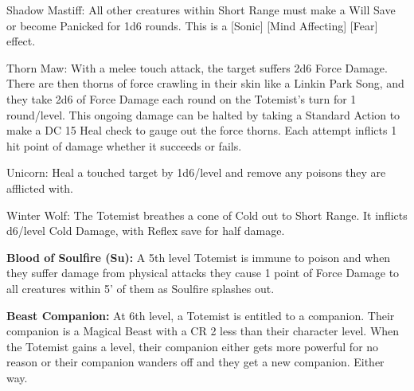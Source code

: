 \begin{itemize*}
\item Shadow Mastiff: All other creatures within Short Range must make a Will Save or become Panicked for 1d6 rounds. This is a [Sonic] [Mind Affecting] [Fear] effect. 
\item Thorn Maw: With a melee touch attack, the target suffers 2d6 Force Damage. There are then thorns of force crawling in their skin like a Linkin Park Song, and they take 2d6 of Force Damage each round on the Totemist's turn for 1 round/level. This ongoing damage can be halted by taking a Standard Action to make a DC 15 Heal check to gauge out the force thorns. Each attempt inflicts 1 hit point of damage whether it succeeds or fails. 
\item Unicorn: Heal a touched target by 1d6/level and remove any poisons they are afflicted with. 
\item Winter Wolf: The Totemist breathes a cone of Cold out to Short Range. It inflicts d6/level Cold Damage, with Reflex save for half damage.
\end{itemize*}

\textbf{Blood of Soulfire (Su):} A 5th level Totemist is immune to poison and when they suffer damage from physical attacks they cause 1 point of Force Damage to all creatures within 5' of them as Soulfire splashes out. 

\textbf{Beast Companion:} At 6th level, a Totemist is entitled to a companion. Their companion is a Magical Beast with a CR 2 less than their character level. When the Totemist gains a level, their companion either gets more powerful for no reason or their companion wanders off and they get a new companion. Either way. 

